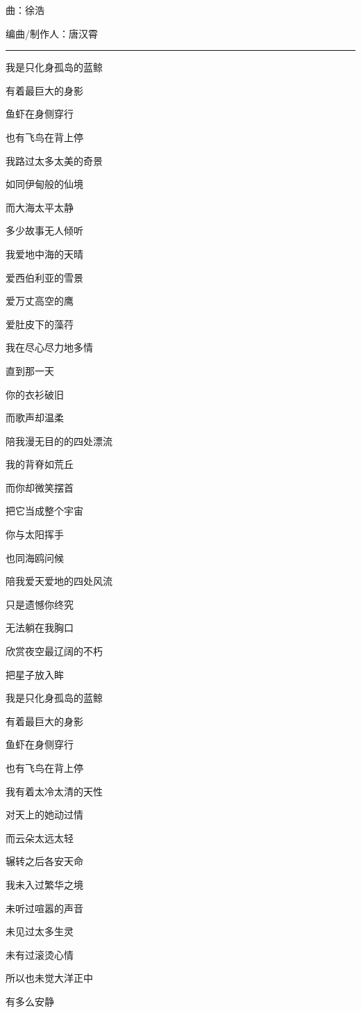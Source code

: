 \documentclass[
]{book}
\begin{document}
曲：徐浩

编曲/制作人：唐汉霄

\begin{center}\rule{0.5\linewidth}{0.5pt}\end{center}

我是只化身孤岛的蓝鲸

有着最巨大的身影

鱼虾在身侧穿行

也有飞鸟在背上停

我路过太多太美的奇景

如同伊甸般的仙境

而大海太平太静

多少故事无人倾听

我爱地中海的天晴

爱西伯利亚的雪景

爱万丈高空的鹰

爱肚皮下的藻荇

我在尽心尽力地多情

直到那一天

你的衣衫破旧

而歌声却温柔

陪我漫无目的的四处漂流

我的背脊如荒丘

而你却微笑摆首

把它当成整个宇宙

你与太阳挥手

也同海鸥问候

陪我爱天爱地的四处风流

只是遗憾你终究

无法躺在我胸口

欣赏夜空最辽阔的不朽

把星子放入眸

我是只化身孤岛的蓝鲸

有着最巨大的身影

鱼虾在身侧穿行

也有飞鸟在背上停

我有着太冷太清的天性

对天上的她动过情

而云朵太远太轻

辗转之后各安天命

我未入过繁华之境

未听过喧嚣的声音

未见过太多生灵

未有过滚烫心情

所以也未觉大洋正中

有多么安静
\end{document}
